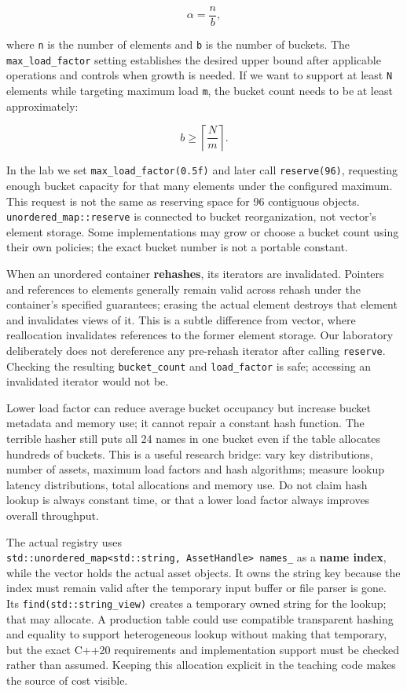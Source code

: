 \[
\alpha = \frac{n}{b},
\]

where \texttt{n} is the number of elements and \texttt{b} is the number of buckets. The \texttt{max\_load\_factor} setting establishes the desired upper bound after applicable operations and controls when growth is needed. If we want to support at least \texttt{N} elements while targeting maximum load \texttt{m}, the bucket count needs to be at least approximately:

\[
b \ge \left\lceil \frac{N}{m} \right\rceil.
\]

In the lab we set \texttt{max\_load\_factor(0.5f)} and later call \texttt{reserve(96)}, requesting enough bucket capacity for that many elements under the configured maximum. This request is not the same as reserving space for 96 contiguous objects. \texttt{unordered\_map::reserve} is connected to bucket reorganization, not vector's element storage. Some implementations may grow or choose a bucket count using their own policies; the exact bucket number is not a portable constant.

When an unordered container \textbf{rehashes}, its iterators are invalidated. Pointers and references to elements generally remain valid across rehash under the container's specified guarantees; erasing the actual element destroys that element and invalidates views of it. This is a subtle difference from vector, where reallocation invalidates references to the former element storage. Our laboratory deliberately does not dereference any pre-rehash iterator after calling \texttt{reserve}. Checking the resulting \texttt{bucket\_count} and \texttt{load\_factor} is safe; accessing an invalidated iterator would not be.

Lower load factor can reduce average bucket occupancy but increase bucket metadata and memory use; it cannot repair a constant hash function. The terrible hasher still puts all 24 names in one bucket even if the table allocates hundreds of buckets. This is a useful research bridge: vary key distributions, number of assets, maximum load factors and hash algorithms; measure lookup latency distributions, total allocations and memory use. Do not claim hash lookup is always constant time, or that a lower load factor always improves overall throughput.

The actual registry uses \texttt{std::unordered\_map\textless{}std::string,\ AssetHandle\textgreater{}\ names\_} as a \textbf{name index}, while the vector holds the actual asset objects. It owns the string key because the index must remain valid after the temporary input buffer or file parser is gone. Its \texttt{find(std::string\_view)} creates a temporary owned string for the lookup; that may allocate. A production table could use compatible transparent hashing and equality to support heterogeneous lookup without making that temporary, but the exact C++20 requirements and implementation support must be checked rather than assumed. Keeping this allocation explicit in the teaching code makes the source of cost visible.

